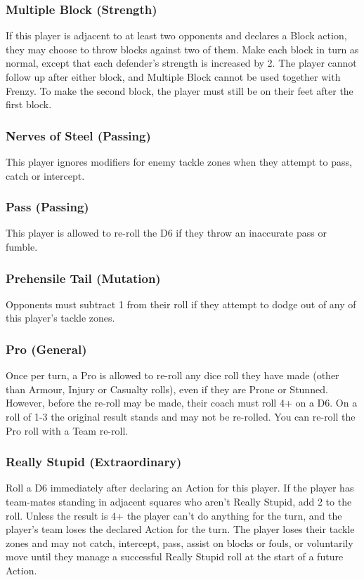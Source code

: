 \documentclass{article}
\begin{document}
\begin{multicols}{3}
\subsubsection{Multiple Block (Strength)}
\par If this player is adjacent to at least two opponents and declares a Block action, they may choose to throw blocks against two of them. Make each block in turn as normal, except that each defender's strength is increased by 2. The player cannot follow up after either block, and Multiple Block cannot be used together with Frenzy. To make the second block, the player must still be on their feet after the first block.

\subsubsection{Nerves of Steel (Passing)}
\par This player ignores modifiers for enemy tackle zones when they attempt to pass, catch or intercept.

\subsubsection{Pass (Passing)}
\par This player is allowed to re-roll the D6 if they throw an inaccurate pass or fumble.

\subsubsection{Prehensile Tail (Mutation)}
\par Opponents must subtract 1 from their roll if they attempt to dodge out of any of this player's tackle zones.

\subsubsection{Pro (General)}
\par Once per turn, a Pro is allowed to re-roll any dice roll they have made (other than Armour, Injury or Casualty rolls), even if they are Prone or Stunned. However, before the re-roll may be made, their coach must roll 4+ on a D6. On a roll of 1-3 the original result stands and may not be re-rolled. You can re-roll the Pro roll with a Team re-roll.

\subsubsection{Really Stupid (Extraordinary)}
\par Roll a D6 immediately after declaring an Action for this player. If the player has team-mates standing in adjacent squares who aren't Really Stupid, add 2 to the roll. Unless the result is 4+ the player can't do anything for the turn, and the player's team loses the declared Action for the turn. The player loses their tackle zones and may not catch, intercept, pass, assist on blocks or fouls, or voluntarily move until they manage a successful Really Stupid roll at the start of a future Action.


\end{multicols}
\end{document}
